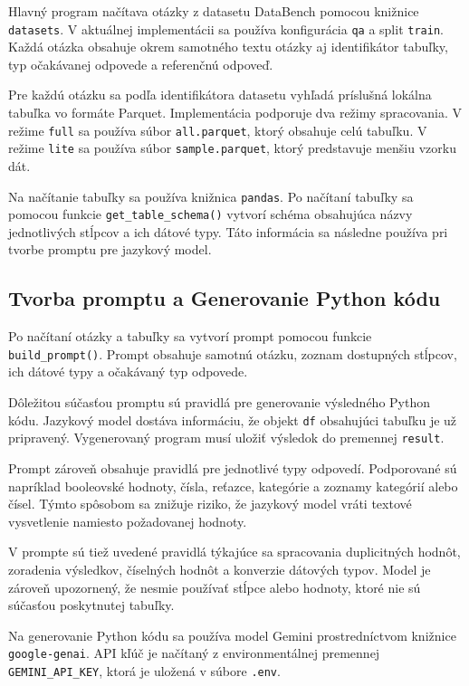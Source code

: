 Hlavný program načítava otázky z datasetu DataBench pomocou knižnice
\texttt{datasets}. V aktuálnej implementácii sa používa konfigurácia
\texttt{qa} a split \texttt{train}. Každá otázka obsahuje okrem samotného
textu otázky aj identifikátor tabuľky, typ očakávanej odpovede a referenčnú
odpoveď.

Pre každú otázku sa podľa identifikátora datasetu vyhľadá príslušná lokálna
tabuľka vo formáte Parquet. Implementácia podporuje dva režimy spracovania.
V režime \texttt{full} sa používa súbor \texttt{all.parquet}, ktorý obsahuje
celú tabuľku. V režime \texttt{lite} sa používa súbor
\texttt{sample.parquet}, ktorý predstavuje menšiu vzorku dát.

Na načítanie tabuľky sa používa knižnica \texttt{pandas}. Po načítaní tabuľky
sa pomocou funkcie \texttt{get\_table\_schema()} vytvorí schéma obsahujúca
názvy jednotlivých stĺpcov a ich dátové typy. Táto informácia sa následne
používa pri tvorbe promptu pre jazykový model.

\subsection{Tvorba promptu a Generovanie Python kódu}

Po načítaní otázky a tabuľky sa vytvorí prompt pomocou funkcie
\texttt{build\_prompt()}. Prompt obsahuje samotnú otázku, zoznam dostupných
stĺpcov, ich dátové typy a očakávaný typ odpovede.

Dôležitou súčasťou promptu sú pravidlá pre generovanie výsledného Python
kódu. Jazykový model dostáva informáciu, že objekt \texttt{df} obsahujúci
tabuľku je už pripravený. Vygenerovaný program musí uložiť výsledok do
premennej \texttt{result}.

Prompt zároveň obsahuje pravidlá pre jednotlivé typy odpovedí. Podporované
sú napríklad booleovské hodnoty, čísla, reťazce, kategórie a zoznamy
kategórií alebo čísel. Týmto spôsobom sa znižuje riziko, že jazykový model
vráti textové vysvetlenie namiesto požadovanej hodnoty.

V prompte sú tiež uvedené pravidlá týkajúce sa spracovania duplicitných
hodnôt, zoradenia výsledkov, číselných hodnôt a konverzie dátových typov.
Model je zároveň upozornený, že nesmie používať stĺpce alebo hodnoty, ktoré
nie sú súčasťou poskytnutej tabuľky.


Na generovanie Python kódu sa používa model Gemini prostredníctvom knižnice
\texttt{google-genai}. API kľúč je načítaný z environmentálnej premennej
\texttt{GEMINI\_API\_KEY}, ktorá je uložená v súbore \texttt{.env}.

